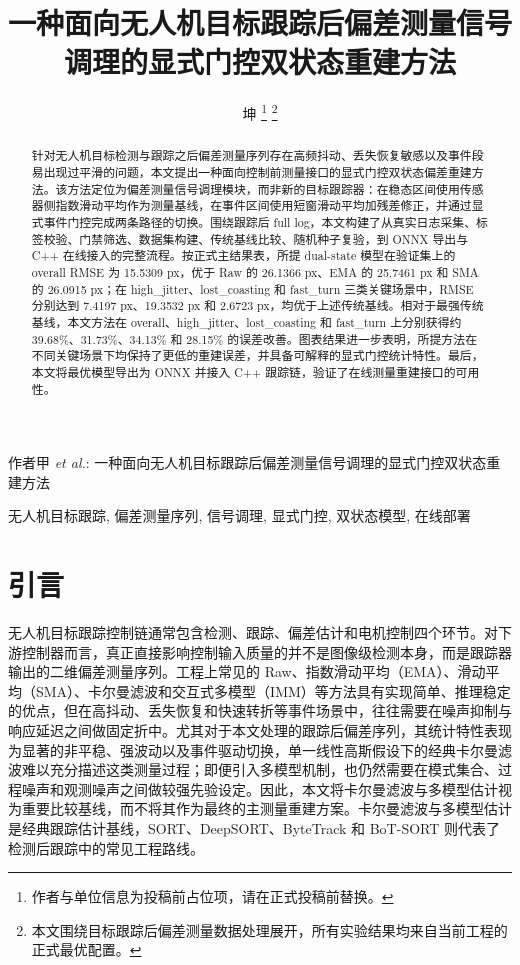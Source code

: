 ﻿\documentclass[lettersize,journal]{IEEEtran}
\begin{document}
\title{一种面向无人机目标跟踪后偏差测量信号调理的显式门控双状态重建方法}

\author{坤%
\thanks{作者与单位信息为投稿前占位项，请在正式投稿前替换。}%
\thanks{本文围绕目标跟踪后偏差测量数据处理展开，所有实验结果均来自当前工程的正式最优配置。}}

%
{作者甲 \MakeLowercase{\textit{et al.}}: 一种面向无人机目标跟踪后偏差测量信号调理的显式门控双状态重建方法}

\maketitle

\begin{abstract}
针对无人机目标检测与跟踪之后偏差测量序列存在高频抖动、丢失恢复敏感以及事件段易出现过平滑的问题，本文提出一种面向控制前测量接口的显式门控双状态偏差重建方法。该方法定位为偏差测量信号调理模块，而非新的目标跟踪器：在稳态区间使用传感器侧指数滑动平均作为测量基线，在事件区间使用短窗滑动平均加残差修正，并通过显式事件门控完成两条路径的切换。围绕跟踪后 full log，本文构建了从真实日志采集、标签校验、门禁筛选、数据集构建、传统基线比较、随机种子复验，到 ONNX 导出与 C++ 在线接入的完整流程。按正式主结果表，所提 dual-state 模型在验证集上的 overall RMSE 为 15.5309 px，优于 Raw 的 26.1366 px、EMA 的 25.7461 px 和 SMA 的 26.0915 px；在 high\_jitter、lost\_coasting 和 fast\_turn 三类关键场景中，RMSE 分别达到 7.4197 px、19.3532 px 和 2.6723 px，均优于上述传统基线。相对于最强传统基线，本文方法在 overall、high\_jitter、lost\_coasting 和 fast\_turn 上分别获得约 39.68\%、31.73\%、34.13\% 和 28.15\% 的误差改善。图表结果进一步表明，所提方法在不同关键场景下均保持了更低的重建误差，并具备可解释的显式门控统计特性。最后，本文将最优模型导出为 ONNX 并接入 C++ 跟踪链，验证了在线测量重建接口的可用性。
\end{abstract}

\begin{IEEEkeywords}
无人机目标跟踪, 偏差测量序列, 信号调理, 显式门控, 双状态模型, 在线部署
\end{IEEEkeywords}

\section{引言}
无人机目标跟踪控制链通常包含检测、跟踪、偏差估计和电机控制四个环节。对下游控制器而言，真正直接影响控制输入质量的并不是图像级检测本身，而是跟踪器输出的二维偏差测量序列。工程上常见的 Raw、指数滑动平均（EMA）、滑动平均（SMA）、卡尔曼滤波和交互式多模型（IMM）等方法具有实现简单、推理稳定的优点，但在高抖动、丢失恢复和快速转折等事件场景中，往往需要在噪声抑制与响应延迟之间做固定折中。尤其对于本文处理的跟踪后偏差序列，其统计特性表现为显著的非平稳、强波动以及事件驱动切换，单一线性高斯假设下的经典卡尔曼滤波难以充分描述这类测量过程；即便引入多模型机制，也仍然需要在模式集合、过程噪声和观测噪声之间做较强先验设定。因此，本文将卡尔曼滤波与多模型估计视为重要比较基线，而不将其作为最终的主测量重建方案。卡尔曼滤波与多模型估计是经典跟踪估计基线，SORT、DeepSORT、ByteTrack 和 BoT-SORT 则代表了检测后跟踪中的常见工程路线\cite{kalman1960new,barshalom2001estimation,bewley2016sort,wojke2017deepsort,zhang2022bytetrack,aharon2022botsort}。
\end{document}
